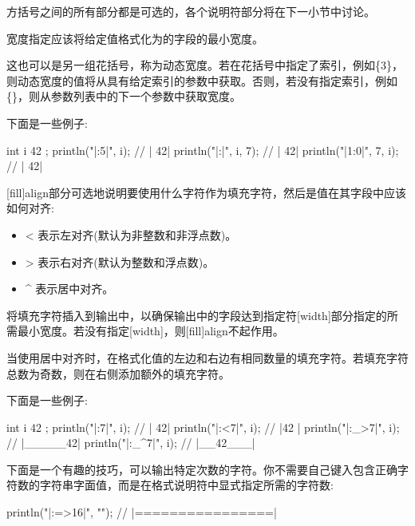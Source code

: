 方括号之间的所有部分都是可选的，各个说明符部分将在下一小节中讨论。


宽度指定应该将给定值格式化为的字段的最小宽度。

这也可以是另一组花括号，称为动态宽度。若在花括号中指定了索引，例如\{3\}，则动态宽度的值将从具有给定索引的参数中获取。否则，若没有指定索引，例如\{\}，则从参数列表中的下一个参数中获取宽度。

下面是一些例子:

\begin{cpp}
int i { 42 };
println("|{:5}|", i);        // |    42|
println("|{:{}}|", i, 7);    // |       42|
println("|{1:{0}}|", 7, i);  // |       42|
\end{cpp}



[fill]align部分可选地说明要使用什么字符作为填充字符，然后是值在其字段中应该如何对齐:

\begin{itemize}
\item
< 表示左对齐(默认为非整数和非浮点数)。

\item
> 表示右对齐(默认为整数和浮点数)。

\item
\^{} 表示居中对齐。
\end{itemize}

将填充字符插入到输出中，以确保输出中的字段达到指定符[width]部分指定的所需最小宽度。若没有指定[width]，则[fill]align不起作用。

当使用居中对齐时，在格式化值的左边和右边有相同数量的填充字符。若填充字符总数为奇数，则在右侧添加额外的填充字符。

下面是一些例子:

\begin{cpp}
int i { 42 };
println("|{:7}|", i);     // |     42|
println("|{:<7}|", i);    // |42     |
println("|{:_>7}|", i);   // |_____42|
println("|{:_^7}|", i);   // |__42___|
\end{cpp}

下面是一个有趣的技巧，可以输出特定次数的字符。你不需要自己键入包含正确字符数的字符串字面值，而是在格式说明符中显式指定所需的字符数:

\begin{cpp}
println("|{:=>16}|", ""); // |================|
\end{cpp}


